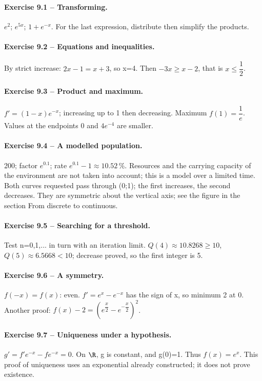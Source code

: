 \paragraph{Exercise 9.1 -- Transforming.} $e^2$; $e^{5x}$; $1+e^{-x}$. For the last expression, distribute then simplify the products.
\paragraph{Exercise 9.2 -- Equations and inequalities.} By strict increase: $2x-1=x+3$, so x=4. Then $-3x\geq x-2$, that is $x\leq \dfrac{1}{2}$.
\paragraph{Exercise 9.3 -- Product and maximum.} $f\prime=(1-x)e^{-x}$; increasing up to 1 then decreasing. Maximum $f(1)=\dfrac{1}{e}$. Values at the endpoints 0 and $4e^{-4}$ are smaller.
\paragraph{Exercise 9.4 -- A modelled population.} 200; factor $e^{0.1}$; rate $e^{0.1}-1\approx10.52\,\%$. Resources and the carrying capacity of the environment are not taken into account; this is a model over a limited time. Both curves requested pass through (0;1); the first increases, the second decreases. They are symmetric about the vertical axis; see the figure in the section From discrete to continuous.
\paragraph{Exercise 9.5 -- Searching for a threshold.} Test n=0,1,... in turn with an iteration limit. $Q(4)\approx10.8268\geq10$, $Q(5)\approx6.5668<10$; decrease proved, so the first integer is 5.
\paragraph{Exercise 9.6 -- A symmetry.} $f(-x)=f(x)$: even. $f\prime=e^x-e^{-x}$ has the sign of x, so minimum 2 at 0. Another proof: $f(x)-2=(e^{\dfrac{x}{2}}-e^{-\dfrac{x}{2}})^2$.
\paragraph{Exercise 9.7 -- Uniqueness under a hypothesis.} $g\prime=f\prime e^{-x}-fe^{-x}=0$. On $\R$, g is constant, and g(0)=1. Thus $f(x)=e^x$. This proof of uniqueness uses an exponential already constructed; it does not prove existence.

